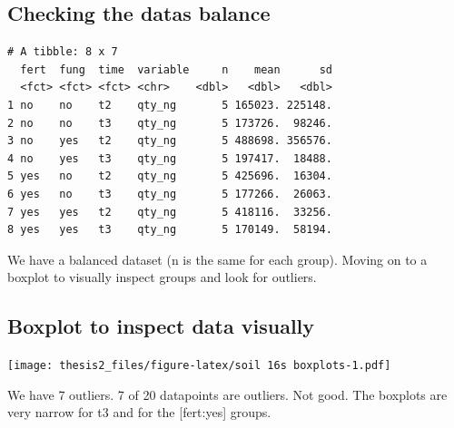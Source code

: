\documentclass[twoside,12pt,final]{ucthesis-CA2012}
\begin{document}
\begin{ucmainmatter}
\hypertarget{checking-the-datas-balance}{%
\subsection{Checking the datas balance}\label{checking-the-datas-balance}}
\begin{verbatim}
# A tibble: 8 x 7
  fert  fung  time  variable     n    mean      sd
  <fct> <fct> <fct> <chr>    <dbl>   <dbl>   <dbl>
1 no    no    t2    qty_ng       5 165023. 225148.
2 no    no    t3    qty_ng       5 173726.  98246.
3 no    yes   t2    qty_ng       5 488698. 356576.
4 no    yes   t3    qty_ng       5 197417.  18488.
5 yes   no    t2    qty_ng       5 425696.  16304.
6 yes   no    t3    qty_ng       5 177266.  26063.
7 yes   yes   t2    qty_ng       5 418116.  33256.
8 yes   yes   t3    qty_ng       5 170149.  58194.
\end{verbatim}
We have a balanced dataset (n is the same for each group). Moving on to a boxplot to visually inspect groups and look for outliers.

\hypertarget{boxplot-to-inspect-data-visually}{%
\subsection{Boxplot to inspect data visually}\label{boxplot-to-inspect-data-visually}}

\texttt{[image: thesis2\_files/figure-latex/soil 16s boxplots-1.pdf]}

We have 7 outliers. 7 of 20 datapoints are outliers. Not good. The boxplots are very narrow for t3 and for the {[}fert:yes{]} groups.

\hypertarget{identifying-the-outliers.}{%
}
\end{ucmainmatter}
\end{document}
